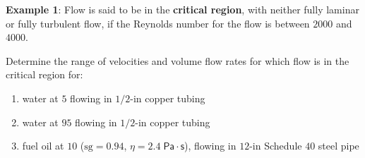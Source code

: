 \documentclass[10pt]{amsart}
\begin{document}

\newpage

\begin{multicols}{2}
\raggedright 



	\textbf{Example 1}:
		Flow is said to be in the \textbf{critical region}, with neither fully laminar or fully turbulent flow, if the Reynolds number for the 
		flow is between $2000$ and $4000$.
		\par\medskip
		Determine the range of velocities and volume flow rates for which flow is in the critical region for:
		\par\medskip
		\begin{enumerate}
		  \item water at $5$\textcelsius{} flowing in $1/2$-in copper tubing 
		  \item water at $95$\textcelsius{} flowing in $1/2$-in copper tubing
		  \item fuel oil at $10$\textcelsius{} ($\text{sg}=0.94$, $\eta=2.4\;\mathsf{Pa\cdot s}$), \newline flowing in $12$-in Schedule $40$ steel pipe
		\end{enumerate}
	

\end{multicols}
\end{document}

